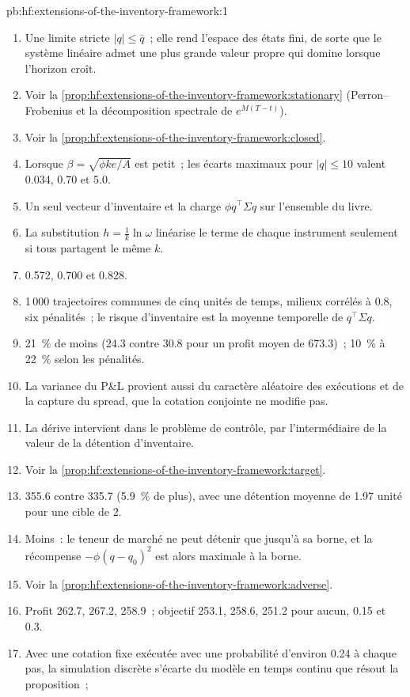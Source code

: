 \begin{solution}{pb:hf:extensions-of-the-inventory-framework:1}
\begin{enumerate}
\item Une limite stricte $|q|\le\bar q$~; elle rend l'espace des états fini, de sorte que le système linéaire admet une plus grande valeur propre qui domine lorsque l'horizon croît.
\item Voir la \cref{prop:hf:extensions-of-the-inventory-framework:stationary} (Perron--Frobenius et la décomposition spectrale de $e^{M(T-t)}$).
\item Voir la \cref{prop:hf:extensions-of-the-inventory-framework:closed}.
\item Lorsque $\beta=\sqrt{\phi ke/A}$ est petit~; les écarts maximaux pour $|q|\le10$ valent 0.034, 0.70 et 5.0.
\item Un seul vecteur d'inventaire et la charge $\phi q^\top\Sigma q$ sur l'ensemble du livre.
\item La substitution $h=\tfrac1k\ln\omega$ linéarise le terme de chaque instrument seulement si tous partagent le même $k$.
\item 0.572, 0.700 et 0.828.
\item 1\,000 trajectoires communes de cinq unités de temps, milieux corrélés à 0.8, six pénalités~; le risque d'inventaire est la moyenne temporelle de $q^\top\Sigma q$.
\item 21~\% de moins (24.3 contre 30.8 pour un profit moyen de 673.3)~; 10~\% à 22~\% selon les pénalités.
\item La variance du P\&L provient aussi du caractère aléatoire des exécutions et de la capture du spread, que la cotation conjointe ne modifie pas.
\item La dérive intervient dans le problème de contrôle, par l'intermédiaire de la valeur de la détention d'inventaire.
\item Voir la \cref{prop:hf:extensions-of-the-inventory-framework:target}.
\item 355.6 contre 335.7 (5.9~\% de plus), avec une détention moyenne de 1.97 unité pour une cible de 2.
\item Moins~: le teneur de marché ne peut détenir que jusqu'à sa borne, et la récompense $-\phi(q-q_0)^2$ est alors maximale à la borne.
\item Voir la \cref{prop:hf:extensions-of-the-inventory-framework:adverse}.
\item Profit 262.7, 267.2, 258.9~; objectif 253.1, 258.6, 251.2 pour aucun, 0.15 et 0.3.
\item Avec une cotation fixe exécutée avec une probabilité d'environ 0.24 à chaque pas, la simulation discrète s'écarte du modèle en temps continu que résout la proposition~;

\end{enumerate}
\end{solution}
